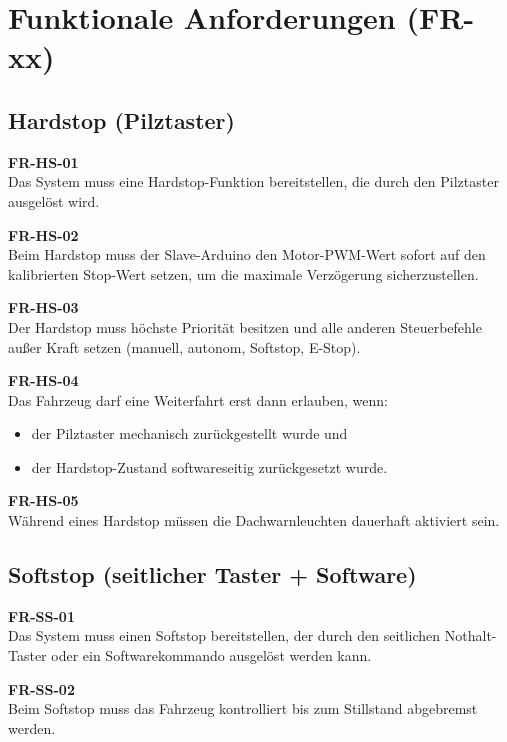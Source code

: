 \section{Funktionale Anforderungen (FR-xx)}
\label{sec:functional_requirements}

\subsection{Hardstop (Pilztaster)}
\label{sec:hardstop}

\textbf{FR-HS-01}\\
Das System muss eine \ac{Hardstop}-Funktion bereitstellen, die durch den Pilztaster ausgelöst wird.

\textbf{FR-HS-02}\\
Beim \ac{Hardstop} muss der Slave-Arduino den Motor-\ac{PWM}-Wert sofort auf den kalibrierten Stop-Wert setzen, um die maximale Verzögerung sicherzustellen.

\textbf{FR-HS-03}\\
Der \ac{Hardstop} muss höchste Priorität besitzen und alle anderen 
Steuerbefehle außer Kraft setzen (manuell, autonom, \ac{Softstop}, \ac{E-Stop}).

\textbf{FR-HS-04}\\
Das Fahrzeug darf eine Weiterfahrt erst dann erlauben, wenn:
\begin{itemize}
    \item der Pilztaster mechanisch zurückgestellt wurde und
    \item der \ac{Hardstop}-Zustand softwareseitig zurückgesetzt wurde.
\end{itemize}

\textbf{FR-HS-05}\\
Während eines \ac{Hardstop} müssen die Dachwarnleuchten dauerhaft aktiviert sein.


\subsection{Softstop (seitlicher Taster + Software)}
\label{sec:softstop}

\textbf{FR-SS-01}\\
Das System muss einen Softstop bereitstellen, der durch den seitlichen Nothalt-Taster oder ein Softwarekommando ausgelöst werden kann.

\textbf{FR-SS-02}\\
Beim Softstop muss das Fahrzeug kontrolliert bis zum Stillstand abgebremst werden.

